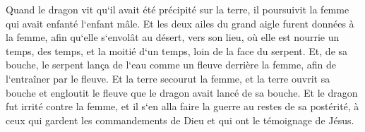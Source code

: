 \verse Quand le dragon vit qu`il avait été précipité sur la terre, il poursuivit la femme qui avait enfanté l`enfant mâle. 
\verse Et les deux ailes du grand aigle furent données à la femme, afin qu`elle s`envolât au désert, vers son lieu, où elle est nourrie un temps, des temps, et la moitié d`un temps, loin de la face du serpent. 
\verse Et, de sa bouche, le serpent lança de l`eau comme un fleuve derrière la femme, afin de l`entraîner par le fleuve. 
\verse Et la terre secourut la femme, et la terre ouvrit sa bouche et engloutit le fleuve que le dragon avait lancé de sa bouche. 
\verse Et le dragon fut irrité contre la femme, et il s`en alla faire la guerre au restes de sa postérité, à ceux qui gardent les commandements de Dieu et qui ont le témoignage de Jésus. 

\chapter{}

